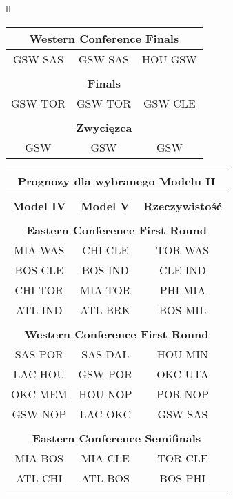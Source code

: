 \documentclass[inzynierska]{pwr_wmat_praca_dyplomowa}
\theoremstyle{plain}
\numberwithin{theorem}{chapter}
\theoremstyle{definition}
\numberwithin{theorem}{chapter}
\begin{document}
\begin{table}[]
\begin{tabular}{ll}
\begin{tabular}{|c|c|c|}
	\multicolumn{3}{|c|}{\textbf{Western Conference Finals}} \\\hline
	GSW-SAS&GSW-SAS &HOU-GSW\\\hline
	\multicolumn{3}{|c|}{} \\\hline
	
	\multicolumn{3}{|c|}{\textbf{Finals}} \\\hline
	GSW-TOR& GSW-TOR &GSW-CLE\\\hline
	\multicolumn{3}{|c|}{} \\\hline
	
	\multicolumn{3}{|c|}{\textbf{Zwycięzca}} \\\hline
	GSW&  GSW&GSW\\\hline
	\end{tabular}

	\begin{tabular}{ |c|c|c|  }
		\hline
		\multicolumn{3}{|c|}{\textbf{Prognozy dla wybranego Modelu II}} \\\hline
		\multicolumn{3}{|c|}{} \\\hline	
		\textbf{Model IV}& \textbf{Model V} &\textbf{Rzeczywistość}\\\hline	
		
		\multicolumn{3}{|c|}{} \\\hline	
		\multicolumn{3}{|c|}{\textbf{Eastern Conference First Round}} \\\hline
		MIA-WAS& CHI-CLE &TOR-WAS\\\hline
		BOS-CLE&BOS-IND &CLE-IND\\\hline
		CHI-TOR&MIA-TOR &PHI-MIA\\\hline
		ATL-IND&ATL-BRK &BOS-MIL\\\hline
		\multicolumn{3}{|c|}{} \\\hline
		
		\multicolumn{3}{|c|}{\textbf{Western Conference First Round}} \\\hline
		SAS-POR&SAS-DAL &HOU-MIN\\\hline
		LAC-HOU&GSW-POR &OKC-UTA\\\hline
		OKC-MEM& HOU-NOP&POR-NOP\\\hline
		GSW-NOP& LAC-OKC&GSW-SAS\\\hline
		\multicolumn{3}{|c|}{} \\\hline
		
		\multicolumn{3}{|c|}{\textbf{Eastern Conference Semifinals}} \\\hline
		MIA-BOS& MIA-CLE&TOR-CLE\\\hline
		ATL-CHI& ATL-BOS&BOS-PHI\\\hline
		\multicolumn{3}{|c|}{} \\\hline
		

\end{tabular}
\end{tabular}
\end{table}
\end{document}
